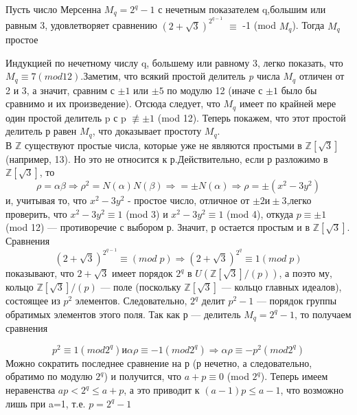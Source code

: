 \documentclass{mai_book}
\begin{document}
	\noindent
	
	\begin{sled}
	\noindent
	Пусть число Мерсенна $M_q = 2^q - 1$ с нечетным показателем q,большим или равным 3, удовлетворяет сравнению $(2+\sqrt{3})^{2^{q-1}}$ $\equiv$ -1 (mod $M_q$). Тогда $M_q$ простое
	\end{sled}
		
	\begin{myproof}
	\noindent
	
	Индукцией по нечетному числу q, большему или равному 3, легко показать, что $M_q \equiv 7 (mod 12)$.Заметим, что всякий простой делитель {\it p} числа $M_q$  отличен от 2 и 3, а значит, сравним с $\pm1 $  или $\pm5$ по модулю 12  (иначе  с $\pm1$ было бы сравнимо и их произведение). Отсюда следует, что $M_q$  имеет по крайней мере один простой	делитель p с p $\not\equiv \pm1$ (mod 12). Теперь покажем, что этот простой делитель р равен $M_q$, что доказывает простоту $M_q$. \\ В $\mathbb Z$ существуют простые числа, которые уже не являются простыми в $\mathbb Z[\sqrt{3}]$  (например, 13). Но это не относится к р.Действительно,	если р разложимо в $\mathbb Z[\sqrt{3}]$, то \\
	\begin{equation}
	\rho=\alpha\beta\Rightarrow \rho^2=N(\alpha)N(\beta)\Rightarrow= \pm N(\alpha)\Rightarrow \rho=\pm(x^2-3y^2)
	\end{equation}
	и, учитывая то, что $x^2-3y^2$ - простое число, отличное от $\pm2 и \pm3$,легко проверить, что $x^2-3y^2\equiv1$  (mod 3) и $x^2-3y^2\equiv1$ (mod 4), откуда $p\equiv\pm1$ (mod 12) — противоречие с выбором р. Значит, р остается простым и в $\mathbb Z[\sqrt{3}]$.\\ Сравнения \\ 
	\begin{equation}
	(2+\sqrt{3})^{2^{q-1}}\equiv (mod\;p) \Rightarrow (2+\sqrt{3})^{2^{q}} \equiv 1 (mod \;p)
	\end{equation}
	показывают, что $2+\sqrt{3}$ имеет порядок $2^q$ в $U (\mathbb Z[\sqrt{3}]/(p))$, а поэто	му, кольцо $\mathbb Z[\sqrt{3}]/(p)$ — поле (поскольку $\mathbb Z[\sqrt{3}]$  — кольцо главных
	идеалов), состоящее из $p^2$ элементов. Следовательно, $2^q$ делит $p^2-1$ — порядок группы обратимых элементов этого поля. Так как р — делитель $M_q = 2^q-1$, то получаем сравнения
	
    \noindent
	\pagebreak
	
	
	
		\begin{equation}
		p^2\equiv1(mod 2^q) и \alpha\rho\equiv-1 (mod 2^q) \Rightarrow \alpha\rho\equiv-p^2 (mod 2^q)
		\end{equation}
		Можно сократить последнее сравнение на р (р нечетно, а следовательно, обратимо по модулю $2^q$) и получится, что $a+p \equiv0$ (mod $2^q$). Теперь имеем неравенства $ap<2^q\leqslant a+p$, а это приводит к $(a-1)p \leqslant a -1$, что возможно лишь при a=1, т.е. $p=2^q-1$
	\end{myproof}
\end{document}
